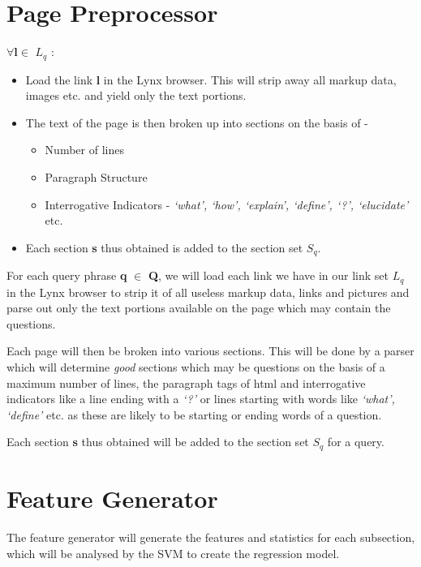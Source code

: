 \documentclass[10pt,a4paper]{report}
\begin{document}
\section{Page Preprocessor}

$\forall \textbf{l} \in$ \textbf{$L_{q}$} :

\begin{itemize}
	\item Load the link \textbf{l} in the Lynx browser. This will strip away all markup data, images etc. and yield only the text portions.
	\item The text of the page is then broken up into sections on the basis of - \\
	\begin{itemize}
		\item Number of lines
		\item Paragraph Structure
		\item Interrogative Indicators - \textit{`what', `how', `explain', `define', `?', `elucidate'} etc.
	\end{itemize}
	\item Each section \textbf{s} thus obtained is added to the section set \textbf{$S_{q}$}.
\end{itemize} 

For each query phrase \textbf{q} $\in$ \textbf{Q}, we will load each link we have in our link set \textbf{$L_{q}$} in the Lynx browser to strip it of all useless markup data, links and pictures and parse out only the text portions available on the page which may contain the questions. 

Each page will then be broken into various sections. This will be done by a parser which will determine \textit{good} sections which may be questions on the basis of a maximum number of lines, the paragraph tags of html and interrogative indicators like a line ending with a \textit{`?'} or lines starting with words like \textit{`what', `define'} etc. as these are likely to be starting or ending words of a question.

Each section \textbf{s} thus obtained will be added to the section set \textbf{$S_{q}$} for a query.

\section{Feature Generator}

The feature generator will generate the features and statistics for each subsection, which will be analysed by the SVM to create the regression model. 
\end{document}
